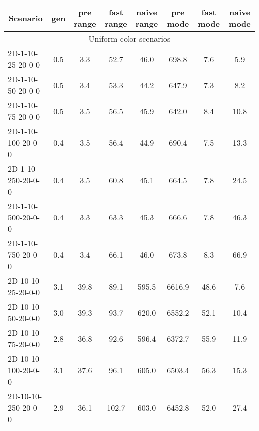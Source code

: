 \documentclass{article}
\begin{document}
    \begin{table}[h]
        \begin{center}
        \hskip0.8cm
        \begin{tabular}{|l||c|c|c|c|c|c|c|}
            \hline
            \multicolumn{1}{|c|}{Scenario} & gen  & pre range & fast range & naive range & pre mode & fast mode & naive mode \\
            \hline
            \hline
            \multicolumn{8}{|c|}{Uniform color scenarios}                                                                    \\
            \hline
            2D-1-10-25-20-0-0              & 0.5  & 3.3       & 52.7       & 46.0        & 698.8    & 7.6       & 5.9        \\
            2D-1-10-50-20-0-0              & 0.5  & 3.4       & 53.3       & 44.2        & 647.9    & 7.3       & 8.2        \\
            2D-1-10-75-20-0-0              & 0.5  & 3.5       & 56.5       & 45.9        & 642.0    & 8.4       & 10.8       \\
            2D-1-10-100-20-0-0             & 0.4  & 3.5       & 56.4       & 44.9        & 690.4    & 7.5       & 13.3       \\
            2D-1-10-250-20-0-0             & 0.4  & 3.5       & 60.8       & 45.1        & 664.5    & 7.8       & 24.5       \\
            2D-1-10-500-20-0-0             & 0.4  & 3.3       & 63.3       & 45.3        & 666.6    & 7.8       & 46.3       \\
            2D-1-10-750-20-0-0             & 0.4  & 3.4       & 66.1       & 46.0        & 673.8    & 8.3       & 66.9       \\
            \hline
            2D-10-10-25-20-0-0             & 3.1  & 39.8      & 89.1       & 595.5       & 6616.9   & 48.6      & 7.6        \\
            2D-10-10-50-20-0-0             & 3.0  & 39.3      & 93.7       & 620.0       & 6552.2   & 52.1      & 10.4       \\
            2D-10-10-75-20-0-0             & 2.8  & 36.8      & 92.6       & 596.4       & 6372.7   & 55.9      & 11.9       \\
            2D-10-10-100-20-0-0            & 3.1  & 37.6      & 96.1       & 605.0       & 6503.4   & 56.3      & 15.3       \\
            2D-10-10-250-20-0-0            & 2.9  & 36.1      & 102.7      & 603.0       & 6452.8   & 52.0      & 27.4       \\

\end{tabular}
\end{center}
\end{table}
\end{document}
